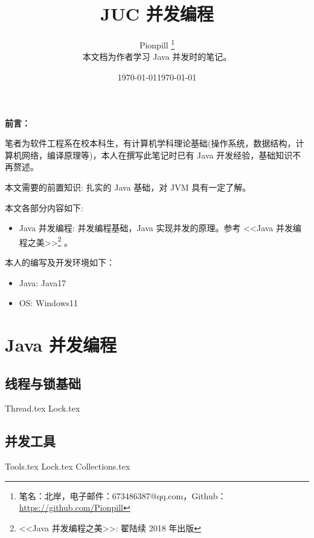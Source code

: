 \documentclass{PionpillNote-book}
\title{JUC 并发编程}
\author{
    Pionpill \footnote{笔名：北岸，电子邮件：673486387@qq.com，Github：\url{https://github.com/Pionpill}} \\
    本文档为作者学习 Java 并发时的笔记。\\
}
\date{\today}
\begin{document}
\pagestyle{plain}
\maketitle

\noindent\textbf{前言：}

笔者为软件工程系在校本科生，有计算机学科理论基础(操作系统，数据结构，计算机网络，编译原理等)，本人在撰写此笔记时已有 Java 开发经验，基础知识不再赘述。

本文需要的前置知识: 扎实的 Java 基础，对 JVM 具有一定了解。

本文各部分内容如下:
\begin{itemize}
    \item Java 并发编程: 并发编程基础，Java 实现并发的原理。参考 <<Java 并发编程之美>>\footnote{<<Java 并发编程之美>>: 翟陆续 2018 年出版} 。
\end{itemize}

本人的编写及开发环境如下：
\begin{itemize}
    \item Java: Java17
    \item OS: Windows11
\end{itemize}

\date{\today}
\newpage

\tableofcontents

\newpage

\setcounter{page}{1} 
\pagestyle{fancy}

\part{Java 并发编程}
\chapter{线程与锁基础}
{Thread.tex}
{Lock.tex}

\chapter{并发工具}
{Tools.tex}
{Lock.tex}
{Collections.tex}
\end{document}
